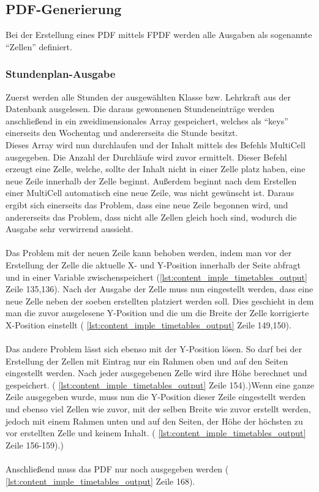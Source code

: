 \subsection{PDF-Generierung}
Bei der Erstellung eines PDF mittels FPDF werden alle Ausgaben als sogenannte \enquote{Zellen} definiert.
\subsubsection{Stundenplan-Ausgabe}
Zuerst werden alle Stunden der ausgewählten Klasse bzw. Lehrkraft aus der Datenbank ausgelesen. Die daraus gewonnenen Stundeneinträge werden anschließend in ein zweidimensionales Array gespeichert, welches als \enquote{keys} einerseits den Wochentag und andererseits die Stunde besitzt. \\
Dieses Array wird nun durchlaufen und der Inhalt mittels des Befehls MultiCell ausgegeben. Die Anzahl der Durchläufe wird zuvor ermittelt. Dieser Befehl erzeugt eine Zelle, welche, sollte der Inhalt nicht in einer Zelle platz haben, eine neue Zeile innerhalb der Zelle beginnt. Außerdem beginnt nach dem Erstellen einer MultiCell automatisch eine neue Zeile, was nicht gewünscht ist. Daraus ergibt sich einerseits das Problem, dass eine neue Zeile begonnen wird, und andererseits das Problem, dass nicht alle Zellen gleich hoch sind, wodurch die Ausgabe sehr verwirrend aussieht. \\\\
Das Problem mit der neuen Zeile kann behoben werden, indem man vor der Erstellung der Zelle die aktuelle X- und Y-Position innerhalb der Seite abfragt und in einer Variable zwischenspeichert (\autoref{lst:content_imple_timetables_output} Zeile 135,136). Nach der Ausgabe der Zelle muss nun eingestellt werden, dass eine neue Zelle neben der soeben erstellten platziert werden soll. Dies geschieht in dem man die zuvor ausgelesene Y-Position und die um die Breite der Zelle korrigierte X-Position einstellt ( \autoref{lst:content_imple_timetables_output} Zeile 149,150).\\\\
Das andere Problem lässt sich ebenso mit der Y-Position lösen. So darf bei der Erstellung der Zellen mit Eintrag nur ein Rahmen oben und auf den Seiten eingestellt werden. Nach jeder ausgegebenen Zelle wird ihre Höhe berechnet und gespeichert. ( \autoref{lst:content_imple_timetables_output} Zeile 154).)Wenn eine ganze Zeile ausgegeben wurde, muss nun die Y-Position dieser Zeile eingestellt werden und ebenso viel Zellen wie zuvor, mit der selben Breite wie zuvor erstellt werden, jedoch mit einem Rahmen unten und auf den Seiten, der Höhe der höchsten zu vor erstellten Zelle und keinem Inhalt.  ( \autoref{lst:content_imple_timetables_output} Zeile 156-159).)
\\\\
Anschließend muss das PDF nur noch ausgegeben werden ( \autoref{lst:content_imple_timetables_output} Zeile 168). 

